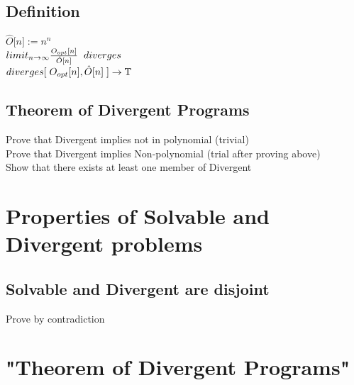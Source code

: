 \documentclass[11pt]{article}
\begin{document}
 \subsection{Definition}
 \begin{center}
$
\hat{O} \lbrack n \rbrack := n^n
$
\\ \vspace{2mm}
$
limit_{n \rightarrow \infty}\frac {O_{opt} \lbrack n \rbrack}{\hat{O}\lbrack n \rbrack} \hspace{2mm} diverges
$
\\ \vspace{2mm}
$
diverges \lbrack \hspace{1mm} O_{opt} \lbrack n \rbrack, \hat{O}\lbrack n \rbrack \hspace{1mm} \rbrack \rightarrow \mathbb{T}
$
\end{center}

\subsection{Theorem of Divergent Programs}
Prove that Divergent implies not in polynomial (trivial)\\
Prove that Divergent implies Non-polynomial (trial after proving above)\\
Show that there exists at least one member of Divergent\\


\section{Properties of Solvable and Divergent problems}

\subsection{Solvable and Divergent are disjoint}
Prove by contradiction



 \section{"Theorem of Divergent Programs"}
\end{document}
